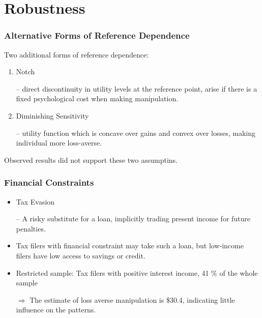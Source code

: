 \documentclass[dvipdfmx,12pt]{beamer}
\begin{document}
\section{Robustness}
\begin{frame}\frametitle{Alternative Forms of Reference Dependence}
  Two additional forms of reference dependence:

  \begin{enumerate}
    \item Notch

    -- direct discontinuity in utility levels at the reference point, arise if there is a fixed psychological cost when making manipulation.

    \item Diminishing Sensitivity

    -- utility function which is concave over gains and convex over losses, making individual more loss-averse.
  \end{enumerate}

  Observed results did not support these two assumptins.
\end{frame}

\begin{frame}\frametitle{Financial Constraints}
  \begin{itemize}
    \item Tax Evasion

    -- A risky substitute for a loan, implicitly trading present income for future penalties.

    \item Tax filers with financial constraint may take such a loan, but low-income filers have low access to savings or credit.

    \item Restricted sample: Tax filers with positive interest income, 41 \% of the whole sample

    $\Rightarrow$ The estimate of loss averse manipulation is \$30.4, indicating little influence on the patterns.
  \end{itemize}
\end{frame}
\end{document}

